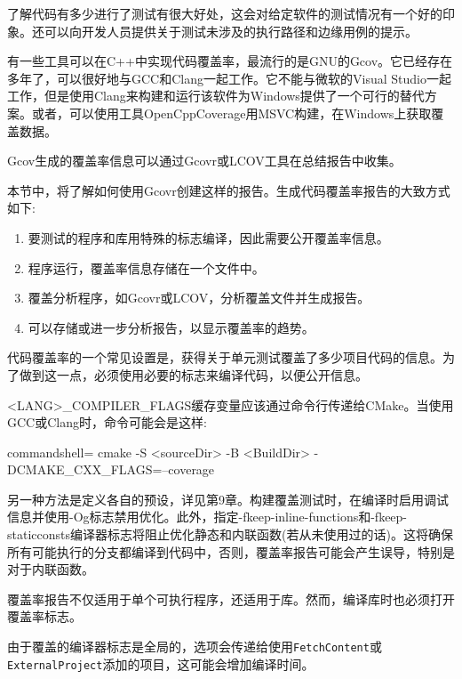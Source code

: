 
了解代码有多少进行了测试有很大好处，这会对给定软件的测试情况有一个好的印象。还可以向开发人员提供关于测试未涉及的执行路径和边缘用例的提示。

有一些工具可以在C++中实现代码覆盖率，最流行的是GNU的Gcov。它已经存在多年了，可以很好地与GCC和Clang一起工作。它不能与微软的Visual Studio一起工作，但是使用Clang来构建和运行该软件为Windows提供了一个可行的替代方案。或者，可以使用工具OpenCppCoverage用MSVC构建，在Windows上获取覆盖数据。

Gcov生成的覆盖率信息可以通过Gcovr或LCOV工具在总结报告中收集。


本节中，将了解如何使用Gcovr创建这样的报告。生成代码覆盖率报告的大致方式如下:

\begin{enumerate}
\item 
要测试的程序和库用特殊的标志编译，因此需要公开覆盖率信息。

\item 
程序运行，覆盖率信息存储在一个文件中。

\item 
覆盖分析程序，如Gcovr或LCOV，分析覆盖文件并生成报告。

\item 
可以存储或进一步分析报告，以显示覆盖率的趋势。
\end{enumerate}

代码覆盖率的一个常见设置是，获得关于单元测试覆盖了多少项目代码的信息。为了做到这一点，必须使用必要的标志来编译代码，以便公开信息。

<LANG>\_COMPILER\_FLAGS缓存变量应该通过命令行传递给CMake。当使用GCC或Clang时，命令可能会是这样:

\begin{tcblisting}{commandshell={}}
cmake -S <sourceDir> -B <BuildDir> -DCMAKE_CXX_FLAGS=--coverage
\end{tcblisting}

另一种方法是定义各自的预设，详见第9章。构建覆盖测试时，在编译时启用调试信息并使用-Og标志禁用优化。此外，指定-fkeep-inline-functions和-fkeep-staticconsts编译器标志将阻止优化静态和内联函数(若从未使用过的话)。这将确保所有可能执行的分支都编译到代码中，否则，覆盖率报告可能会产生误导，特别是对于内联函数。

覆盖率报告不仅适用于单个可执行程序，还适用于库。然而，编译库时也必须打开覆盖率标志。

由于覆盖的编译器标志是全局的，选项会传递给使用\texttt{FetchContent}或\texttt{ExternalProject}添加的项目，这可能会增加编译时间。

